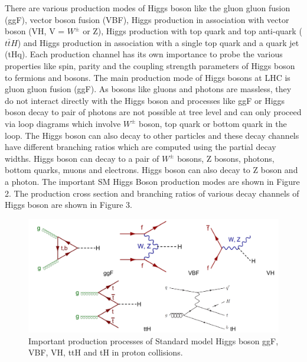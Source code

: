 \documentclass[final,3p]{CSP}
\begin{document}

There are various production modes of Higgs boson like the gluon gluon fusion (ggF), vector boson fusion (VBF), Higgs 
production in association with vector boson (VH, V = $W^{\pm}$ or Z), Higgs production with top quark and top anti-quark ($t\bar{t}H$) and Higgs 
production in association with a single top quark and a quark jet (tHq). Each production channel has its own importance to probe the 
various properties like spin, parity and the coupling strength parameters of Higgs boson to fermions and bosons. The main production mode of Higgs bosons at LHC is 
gluon gluon fusion (ggF). As bosons like gluons and photons are massless, they do not interact directly with the Higgs boson 
and processes like ggF or Higgs boson decay to pair of photons are not possible at tree level and can only proceed via loop 
diagrams which involve $W^{\pm}$ boson, top quark or bottom quark in the loop. The Higgs boson can also decay to other particles and these decay 
channels have different branching ratios which are computed using the partial decay widths. Higgs boson can decay to a pair of $W^{\pm}$ bosons, Z bosons, photons, bottom quarks, 
muons and electrons. Higgs boson can also decay to Z boson and a photon. The important SM Higgs Boson production modes are shown in Figure 2. The production cross section and branching ratios of various decay channels of Higgs boson are shown in Figure 3.

\begin{figure}[H]
	\centering
	\includegraphics[width=\columnwidth]{./pg.png}
	\caption{Important production processes of Standard model Higgs boson ggF, VBF, VH, ttH and tH in proton collisions.}
	\label{figure 2}
\end{figure}
\end{document}
